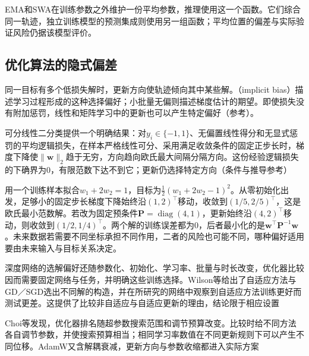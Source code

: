 EMA和SWA在训练参数之外维护一份平均参数，推理使用这一个函数。它们综合同一轨迹，独立训练模型的预测集成则使用另一组函数；平均位置的偏差与实际验证风险仍据该模型评价。

\subsection{优化算法的隐式偏差}
\label{sec:generalization-implicit-bias}

同一目标有多个低损失解时，更新方向使轨迹倾向其中某些解。（implicit bias）描述学习过程形成的这种选择偏好；小批量无偏则描述梯度估计的期望。即使损失没有附加惩罚，线性和矩阵学习中的更新也可以产生特定偏好（参考）。

可分线性二分类提供一个明确结果：对$y_i\in\{-1,1\}$、无偏置线性得分和无显式惩罚的平均逻辑损失，在样本严格线性可分、采用满足收敛条件的固定正步长时，梯度下降使$\lVert\bm w\rVert_2$趋于无穷，方向趋向欧氏最大间隔分隔方向。这份经验逻辑损失的下确界为0，有限范数下达不到它；更新仍选择特定方向（条件与推导参考）

\begin{example}[改变更新几何会改变选出的解]
  \label{ex:generalization-update-geometry}
  用一个训练样本拟合$w_1+2w_2=1$，目标为$\tfrac12(w_1+2w_2-1)^2$。从零初始化出发，足够小的固定步长梯度下降始终沿$(1,2)^{\top}$移动，收敛到$(1/5,2/5)^{\top}$，这是欧氏最小范数解。若改为固定预条件$\bm P=\operatorname{diag}(4,1)$，更新始终沿$(4,2)^{\top}$移动，则收敛到$(1/2,1/4)^{\top}$。两个解的训练误差都为0，后者最小化的是$\bm w^{\top}\bm P^{-1}\bm w$。未来数据若需要不同坐标承担不同作用，二者的风险也可能不同，哪种偏好适用要由未来输入与目标关系决定。
\end{example}

深度网络的选解偏好还随参数化、初始化、学习率、批量与时长改变，优化器比较因而需要固定网络与任务，并明确这些训练选择。Wilson等给出了自适应方法与GD／SGD选出不同解的构造，并在所研究的网络中观察到自适应方法训练更好而测试更差。这提供了比较非自适应与自适应更新的理由，结论限于相应设置

Choi等发现，优化器排名随超参数搜索范围和调节预算改变。比较时给不同方法各自调节参数，并使搜索预算相当；相同学习率数值在不同更新规则下可以产生不同位移。AdamW又含解耦衰减，更新方向与参数收缩都进入实际方案

